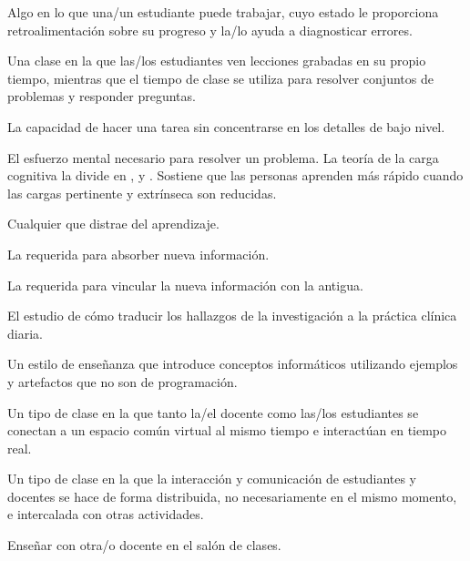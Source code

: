 \begin{description}
 Algo en lo que una/un estudiante puede trabajar,
cuyo estado le proporciona retroalimentación sobre su  progreso y la/lo ayuda a diagnosticar errores.

 Una clase en la que las/los estudiantes
ven lecciones grabadas en su propio tiempo, mientras que el tiempo de clase
se utiliza para resolver conjuntos de problemas y responder preguntas.

 La capacidad de hacer una tarea sin
concentrarse en los detalles de bajo nivel.

 El esfuerzo mental necesario para resolver un problema.
La teoría de la carga cognitiva la divide en
 ,
y .
Sostiene que las personas aprenden más rápido cuando las cargas pertinente y extrínseca son reducidas.

 Cualquier 
que distrae del aprendizaje.

 La 
requerida para absorber nueva información.

 La 
requerida para vincular la nueva información con la antigua.

 El estudio de cómo traducir
los hallazgos de la investigación a la práctica clínica diaria.

 Un estilo de enseñanza que introduce
conceptos informáticos utilizando ejemplos y artefactos que no son de programación.

 Un tipo de clase en la que tanto la/el docente como las/los estudiantes se conectan 
a un espacio común virtual al mismo tiempo e interactúan en tiempo real. 

 Un tipo de clase en la que la interacción y comunicación de estudiantes y docentes
se hace de forma distribuida, no necesariamente en el mismo momento, e intercalada con otras actividades. 

 Enseñar con otra/o docente en el
salón de clases.


\end{description}
